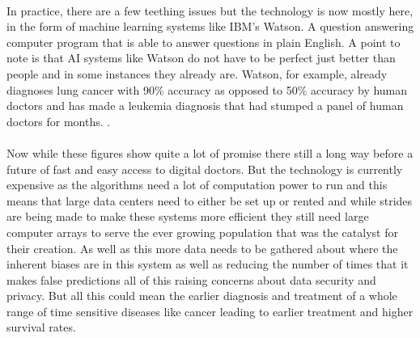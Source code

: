 \documentclass{article}
\begin{document}
\paragraph{}
In practice, there are a few teething issues but the technology is now mostly
here, in the form of machine learning systems like IBM's
Watson\cite{whatiswatson}. A question answering computer program that is able
to answer questions in plain English. A point to note is that AI systems like
Watson do not have to be perfect just better than people and in some instances
they already are. Watson, for example, already diagnoses lung cancer with 90\%
accuracy as opposed to 50\% accuracy by human doctors and has made a leukemia
diagnosis that had stumped a panel of human doctors for months.
\cite{watsonbeatshumans}\cite{iswiredavalidcite}. 

\paragraph{}
Now while these figures show quite a lot of promise there still a long way
before a future of fast and easy access to digital doctors. But the technology
is currently expensive as the algorithms need a lot of computation power to run
and this means that large data centers need to either be set up or rented and
while strides are being made to make these systems more efficient they still
need large computer arrays to serve the ever growing population that was the
catalyst for their creation. As well as this more data needs to be gathered
about where the inherent biases are in this system as well as reducing the
number of times that it makes false predictions all of this raising concerns
about data security and privacy. But all this could mean the earlier diagnosis and
treatment of a whole range of time sensitive diseases like cancer leading to
earlier treatment and higher survival rates.
\end{document}
